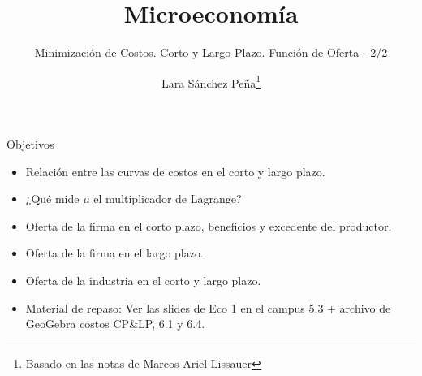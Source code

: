 \documentclass{beamer}
\title{Microeconom\'ia}
\subtitle{Minimizaci\'on de Costos. Corto y Largo Plazo. Funci\'on de Oferta - 2/2 \\ \mydate}
\author[Minimización costos 2/2]{Lara Sánchez Peña\footnote{Basado en las notas de Marcos Ariel Lissauer}}
\institute[]{UTDT}
\date[UTDT 2021]{}
\theoremstyle{definition}
\begin{document}
\begin{frame}
  \titlepage
\end{frame}

\begin{frame}{Objetivos}

\begin{itemize}
\item Relación entre las curvas de costos en el corto y largo plazo.
\item ¿Qué mide $\mu$ el multiplicador de Lagrange?
\item Oferta de la firma en el corto plazo, beneficios y excedente del productor.
\item Oferta de la firma en el largo plazo.
\item Oferta de la industria en el corto y largo plazo.
\item Material de repaso: Ver las slides de Eco 1 en el campus 5.3 + archivo de GeoGebra costos CP\&LP, 6.1 y 6.4.
\end{itemize}
    
\end{frame}
\end{document}

